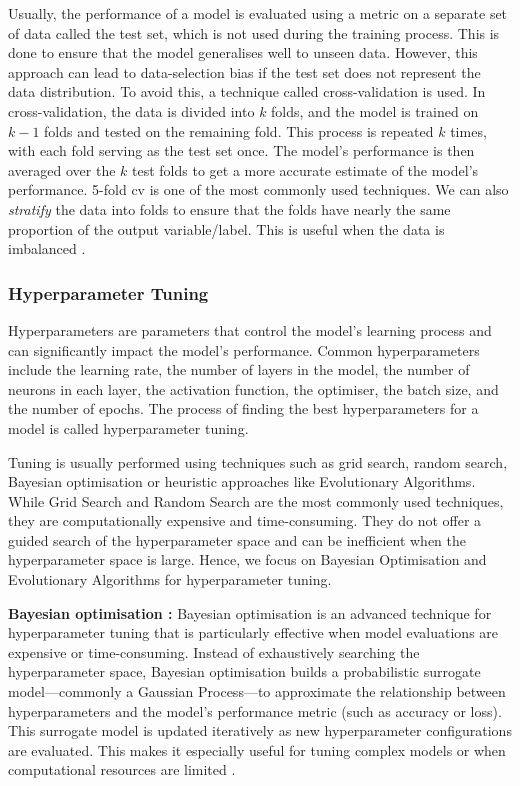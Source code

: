 Usually, the performance of a model is evaluated using a metric on a separate set of data called the test set, which is not used during the training process. This is done to ensure that the model generalises well to unseen data. However, this approach can lead to data-selection bias if the test set does not represent the data distribution. To avoid this, a technique called cross-validation is used. In cross-validation, the data is divided into $k$ folds, and the model is trained on $k-1$ folds and tested on the remaining fold. This process is repeated $k$ times, with each fold serving as the test set once. The model's performance is then averaged over the $k$ test folds to get a more accurate estimate of the model's performance. 5-fold \gls{cv} is one of the most commonly used techniques. We can also \emph{stratify} the data into folds to ensure that the folds have nearly the same proportion of the output variable/label. This is useful when the data is imbalanced \cite{goodfellow_deep_2016}.

\subsubsection{Hyperparameter Tuning}
Hyperparameters are parameters that control the model's learning process and can significantly impact the model's performance. Common hyperparameters include the learning rate, the number of layers in the model, the number of neurons in each layer, the activation function, the optimiser, the batch size, and the number of epochs. The process of finding the best hyperparameters for a model is called hyperparameter tuning. 

Tuning is usually performed using techniques such as grid search, random search, Bayesian optimisation or heuristic approaches like Evolutionary Algorithms. While Grid Search and Random Search are the most commonly used techniques, they are computationally expensive and time-consuming. They do not offer a guided search of the hyperparameter space and can be inefficient when the hyperparameter space is large. Hence, we focus on Bayesian Optimisation and Evolutionary Algorithms for hyperparameter tuning.

\textbf{Bayesian optimisation :} Bayesian optimisation is an advanced technique for hyperparameter tuning that is particularly effective when model evaluations are expensive or time-consuming. Instead of exhaustively searching the hyperparameter space, Bayesian optimisation builds a probabilistic surrogate model—commonly a Gaussian Process—to approximate the relationship between hyperparameters and the model's performance metric (such as accuracy or loss). This surrogate model is updated iteratively as new hyperparameter configurations are evaluated. This makes it especially useful for tuning complex models or when computational resources are limited \cite{frazier_tutorial_2018}.

